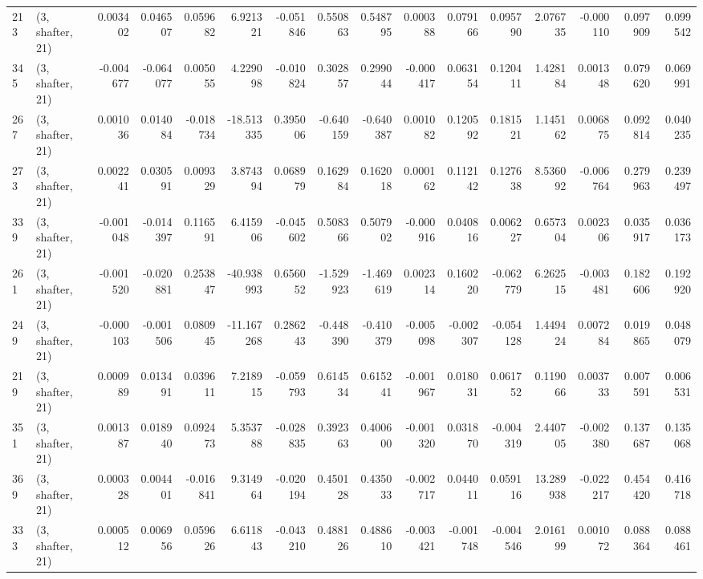 \begin{tabular}{llrrrrrrrrrrrrrr}
213 &  (3, shafter, 21) &   0.003402 &  0.046507 &  0.059682 &    6.921321 & -0.051846 &   0.550863 &   0.548795 &  0.000388 &  0.079166 &  0.095790 &    2.076735 & -0.000110 &   0.097909 &   0.099542 \\
345 &  (3, shafter, 21) &  -0.004677 & -0.064077 &  0.005055 &    4.229098 & -0.010824 &   0.302857 &   0.299044 & -0.000417 &  0.063154 &  0.120411 &    1.428184 &  0.001348 &   0.079620 &   0.069991 \\
267 &  (3, shafter, 21) &   0.001036 &  0.014084 & -0.018734 &  -18.513335 &  0.395006 &  -0.640159 &  -0.640387 &  0.001082 &  0.120592 &  0.181521 &    1.145162 &  0.006875 &   0.092814 &   0.040235 \\
273 &  (3, shafter, 21) &   0.002241 &  0.030591 &  0.009329 &    3.874394 &  0.068979 &   0.162984 &   0.162018 &  0.000162 &  0.112142 &  0.127638 &    8.536092 & -0.006764 &   0.279963 &   0.239497 \\
339 &  (3, shafter, 21) &  -0.001048 & -0.014397 &  0.116591 &    6.415906 & -0.045602 &   0.508366 &   0.507902 & -0.000916 &  0.040816 &  0.006227 &    0.657304 &  0.002306 &   0.035917 &   0.036173 \\
261 &  (3, shafter, 21) &  -0.001520 & -0.020881 &  0.253847 &  -40.938993 &  0.656052 &  -1.529923 &  -1.469619 &  0.002314 &  0.160220 & -0.062779 &    6.262515 & -0.003481 &   0.182606 &   0.192920 \\
249 &  (3, shafter, 21) &  -0.000103 & -0.001506 &  0.080945 &  -11.167268 &  0.286243 &  -0.448390 &  -0.410379 & -0.005098 & -0.002307 & -0.054128 &    1.449424 &  0.007284 &   0.019865 &   0.048079 \\
219 &  (3, shafter, 21) &   0.000989 &  0.013491 &  0.039611 &    7.218915 & -0.059793 &   0.614534 &   0.615241 & -0.001967 &  0.018031 &  0.061752 &    0.119066 &  0.003733 &   0.007591 &   0.006531 \\
351 &  (3, shafter, 21) &   0.001387 &  0.018940 &  0.092473 &    5.353788 & -0.028835 &   0.392363 &   0.400600 & -0.001320 &  0.031870 & -0.004319 &    2.440705 & -0.002380 &   0.137687 &   0.135068 \\
369 &  (3, shafter, 21) &   0.000328 &  0.004401 & -0.016841 &    9.314964 & -0.020194 &   0.450128 &   0.435033 & -0.002717 &  0.044011 &  0.059116 &   13.289938 & -0.022217 &   0.454420 &   0.416718 \\
333 &  (3, shafter, 21) &   0.000512 &  0.006956 &  0.059626 &    6.611843 & -0.043210 &   0.488126 &   0.488610 & -0.003421 & -0.001748 & -0.004546 &    2.016199 &  0.001072 &   0.088364 &   0.088461 \\

\end{tabular}
